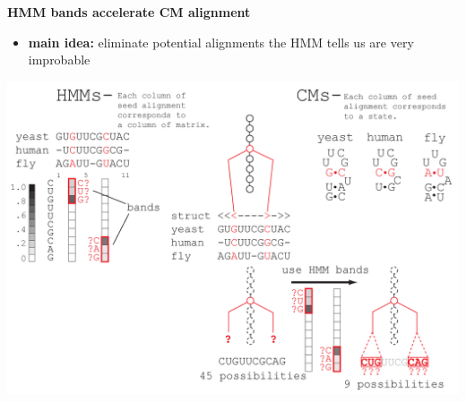 \documentclass[landscape]{slides}
\begin{document}
\begin{slide}
\begin{center}

\textbf{HMM bands accelerate CM alignment}
\end{center}
\medskip
\small
\begin{itemize}
\item
\textbf{main idea:} eliminate potential alignments the HMM tells us are very improbable
\end{itemize}
\begin{center}
\includegraphics[width=8in]{figs/post_hmm_to_cm_map2_layer16}
\end{center}
\vfill
\end{slide}
\end{document}

